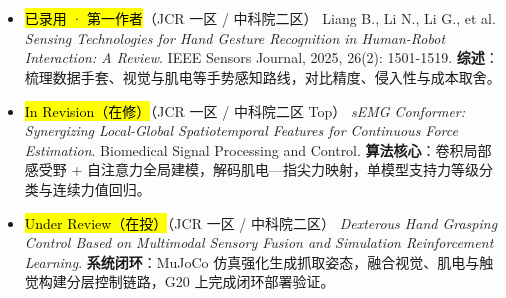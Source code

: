 \section[论文与研究成果]{}
\begin{itemize}
    \item \hl{已录用 · 第一作者}（JCR 一区 / 中科院二区） Liang B., Li N., Li G., et al. \textit{Sensing Technologies for Hand Gesture Recognition in Human-Robot Interaction: A Review}. IEEE Sensors Journal, 2025, 26(2): 1501-1519. \textbf{综述}：梳理数据手套、视觉与肌电等手势感知路线，对比精度、侵入性与成本取舍。
    \item \hl{In Revision（在修）}（JCR 一区 / 中科院二区 Top） \textit{sEMG Conformer: Synergizing Local-Global Spatiotemporal Features for Continuous Force Estimation}. Biomedical Signal Processing and Control. \textbf{算法核心}：卷积局部感受野 + 自注意力全局建模，解码肌电—指尖力映射，单模型支持力等级分类与连续力值回归。
    \item \hl{Under Review（在投）}（JCR 一区 / 中科院二区） \textit{Dexterous Hand Grasping Control Based on Multimodal Sensory Fusion and Simulation Reinforcement Learning}. \textbf{系统闭环}：MuJoCo 仿真强化生成抓取姿态，融合视觉、肌电与触觉构建分层控制链路，G20 上完成闭环部署验证。
\end{itemize}



